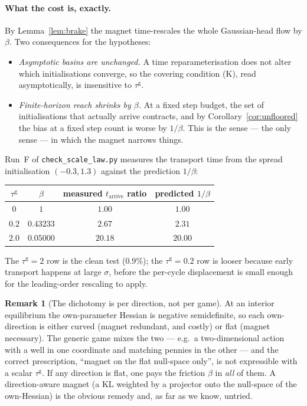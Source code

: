 \documentclass[11pt]{article}
\theoremstyle{definition}
\newtheorem{remark}{Remark}
\newcommand{\KL}{\mathrm{KL}}
\begin{document}
\paragraph{What the cost is, exactly.} By Lemma~\ref{lem:brake} the magnet
time-rescales the whole Gaussian-head flow by $\beta$. Two consequences for the
hypotheses:
\begin{itemize}
\item \emph{Asymptotic basins are unchanged.} A time reparameterisation does not
  alter which initialisations converge, so the covering condition (K), read
  asymptotically, is insensitive to $\tau^{\mathrm g}$.
\item \emph{Finite-horizon reach shrinks by $\beta$.} At a fixed step budget, the
  set of initialisations that actually arrive contracts, and by
  Corollary~\ref{cor:unfloored} the bias at a fixed step count is worse by
  $1/\beta$. This is the sense --- the only sense --- in which the magnet narrows
  things.
\end{itemize}

Run~F of \texttt{check\_scale\_law.py} measures the transport time from the
spread initialisation $(-0.3, 1.3)$ against the prediction $1/\beta$:

\begin{center}
\begin{tabular}{cccc}
\hline
$\tau^{\mathrm g}$ & $\beta$ & measured $t_{\mathrm{arrive}}$ ratio &
  predicted $1/\beta$\\
\hline
$0$ & $1$ & $1.00$ & $1.00$\\
$0.2$ & $0.43233$ & $2.67$ & $2.31$\\
$2.0$ & $0.05000$ & $20.18$ & $20.00$\\
\hline
\end{tabular}
\end{center}

\noindent The $\tau^{\mathrm g} = 2$ row is the clean test ($0.9\%$); the
$\tau^{\mathrm g} = 0.2$ row is looser because early transport happens at large
$\sigma$, before the per-cycle displacement is small enough for the leading-order
rescaling to apply.

\begin{remark}[The dichotomy is per direction, not per game]\label{rem:perdir}
At an interior equilibrium the own-parameter Hessian is negative semidefinite, so
each own-direction is either curved (magnet redundant, and costly) or flat
(magnet necessary). The generic game mixes the two --- e.g.\ a two-dimensional
action with a well in one coordinate and matching pennies in the other --- and the
correct prescription, ``magnet on the flat null-space only'', is not expressible
with a scalar $\tau^{\mathrm g}$. If any direction is flat, one pays the friction
$\beta$ in \emph{all} of them. A direction-aware magnet (a $\KL$ weighted by a
projector onto the null-space of the own-Hessian) is the obvious remedy and, as
far as we know, untried.
\end{remark}
\end{document}
